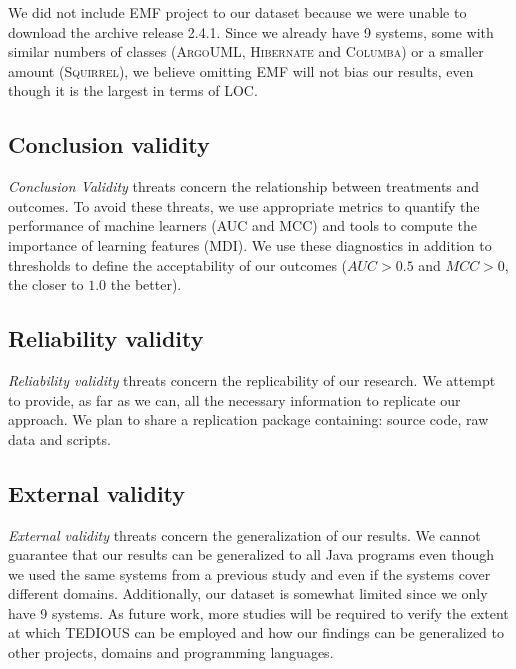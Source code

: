 We did not include \textsc{EMF} project to our dataset because we were unable to download the archive release 2.4.1. Since we already have 9 systems, some with similar numbers of classes (\textsc{ArgoUML}, \textsc{Hibernate} and \textsc{Columba}) or a smaller amount (\textsc{Squirrel}), we believe omitting \textsc{EMF} will not bias our results, even though it is the largest in terms of LOC.

\subsection{Conclusion validity}


\textit{Conclusion Validity} threats concern the relationship between treatments and outcomes. To avoid these threats, we use appropriate metrics to quantify the performance of machine learners (AUC and MCC) and tools to compute the importance of learning features (MDI). We use these diagnostics in addition to thresholds to define the acceptability of our outcomes ($AUC>0.5$ and $MCC>0$, the closer to $1.0$ the better).

\subsection{Reliability validity}


\textit{Reliability validity} threats concern the replicability of our research. We attempt to provide, as far as we can, all the necessary information to replicate our approach. We plan to share a replication package containing: source code, raw data and scripts.

\subsection{External validity}


\textit{External validity} threats concern the generalization of our results. We cannot guarantee that our results can be generalized to all Java programs even though we used the same systems from a previous study \citep{maldonado17} and even if the systems cover different domains. Additionally, our dataset is somewhat limited since we only have 9 systems. As future work, more studies will be required to verify the extent at which TEDIOUS can be employed and how our findings can be generalized to other projects, domains and programming languages.








